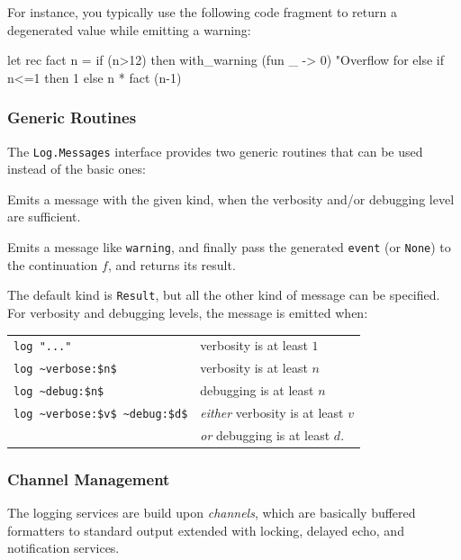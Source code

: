 For instance, you typically use the following code fragment to return
a degenerated value while emitting a warning:
\begin{ocamlcode}
  let rec fact n =
    if (n>12) then
      with_warning (fun _ -> 0) "Overflow for %
    else if n<=1 then 1 else n * fact (n-1)
\end{ocamlcode}

\subsubsection{Generic Routines}

The \lstinline{Log.Messages} interface provides two generic routines
that can be used instead of the basic ones:

\begin{description}
  Emits a message with the given kind, when the verbosity and/or
  debugging level are sufficient.

  Emits a message like \texttt{warning}, and finally pass the generated
  \texttt{event} (or \texttt{None}) to the continuation $f$,
  and returns its result.
\end{description}

The default kind is \lstinline{Result}, but all the other kind of
message can be specified. For verbosity and debugging levels, the
message is emitted when:

\begin{tabular}{ll}
  \lstinline|log "..."| & verbosity is at least $1$ \\
  \lstinline|log ~verbose:$n$| & verbosity is at least $n$ \\
  \lstinline|log ~debug:$n$| & debugging is at least $n$ \\
  \lstinline|log ~verbose:$v$ ~debug:$d$|
  & \emph{either} verbosity is at least $v$ \\
  & \emph{or} debugging is at least $d$.
\end{tabular}

\subsubsection{Channel Management}

The logging services are build upon \emph{channels}, which are
basically buffered formatters to standard output extended with
locking, delayed echo, and notification services.

